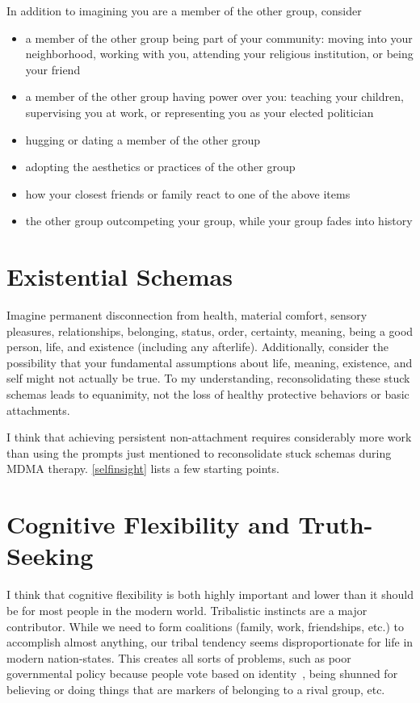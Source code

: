 \documentclass[11pt,oneside]{book}
\let\cite\parencite
\begin{document}
In addition to imagining you are a member of the other group, consider
\begin{itemize}
    \item a member of the other group being part of your community: moving into your neighborhood, working with you, attending your religious institution, or being your friend
    \item a member of the other group having power over you: teaching your children, supervising you at work, or representing you as your elected politician
    \item hugging or dating a member of the other group
    \item adopting the aesthetics or practices of the other group
    \item how your closest friends or family react to one of the above items
    \item the other group outcompeting your group, while your group fades into history
\end{itemize}

\section{Existential Schemas}
Imagine permanent disconnection from health, material comfort, sensory pleasures, relationships, belonging, status, order, certainty, meaning, being a good person, life, and existence (including any afterlife). Additionally, consider the possibility that your fundamental assumptions about life, meaning, existence, and self might not actually be true. To my understanding, reconsolidating these stuck schemas leads to equanimity, not the loss of healthy protective behaviors or basic attachments.

I think that achieving persistent non-attachment requires considerably more work than using the prompts just mentioned to reconsolidate stuck schemas during MDMA therapy. \cref{selfinsight} lists a few starting points.

\section{Cognitive Flexibility and Truth-Seeking}
\label{cognitiveflexibility}
I think that cognitive flexibility is both highly important and lower than it should be for most people in the modern world. Tribalistic instincts are a major contributor. While we need to form coalitions (family, work, friendships, etc.) to accomplish almost anything, our tribal tendency seems disproportionate for life in modern nation-states. This creates all sorts of problems, such as poor governmental policy because people vote based on identity~\cite{klein2020Polarized}, being shunned for believing or doing things that are markers of belonging to a rival group, etc.
\end{document}
